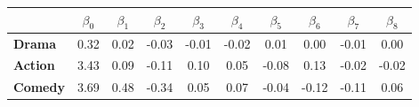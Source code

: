\begin{tabular}{|l|c|c|c|c|c|c|c|c|c|}
\hline
&\textbf{$\beta_{0}$}&\textbf{$\beta_{1}$}&\textbf{$\beta_{2}$}&\textbf{$\beta_{3}$}&\textbf{$\beta_{4}$}&\textbf{$\beta_{5}$}&\textbf{$\beta_{6}$}&\textbf{$\beta_{7}$}&\textbf{$\beta_{8}$}\\\hline
\textbf{Drama}&0.32&0.02&-0.03&-0.01&-0.02&0.01&0.00&-0.01&0.00\\\hline
\textbf{Action}&3.43&0.09&-0.11&0.10&0.05&-0.08&0.13&-0.02&-0.02\\\hline
\textbf{Comedy}&3.69&0.48&-0.34&0.05&0.07&-0.04&-0.12&-0.11&0.06\\\hline
\end{tabular}
